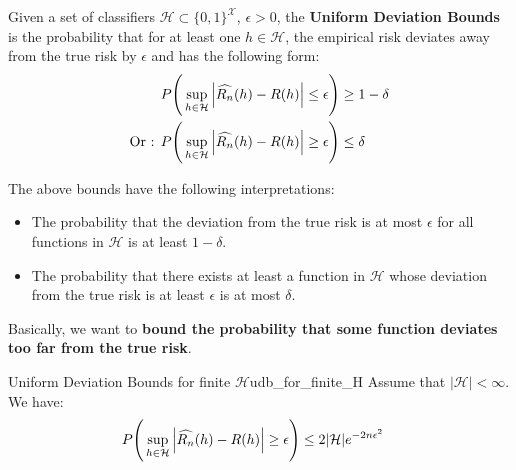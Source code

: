 \begin{definition}
    Given a set of classifiers $\mathcal{H} \subset \{0,1\}^{\mathcal{X}}$, $\epsilon > 0$, the \textbf{Uniform Deviation Bounds} is the probability that for at least one $h\in\mathcal{H}$, the empirical risk deviates away from the true risk by $\epsilon$ and has the following form:
    \begin{align*}
        P\Bigg( 
            \sup_{h\in\mathcal{H}}\Big| \widehat{R_n}(h) - R(h) \Big| \le \epsilon
         \Bigg) &\ge 1 - \delta \\
        \text{Or : }
        P\Bigg( 
            \sup_{h\in\mathcal{H}}\Big| \widehat{R_n}(h) - R(h) \Big| \ge \epsilon
         \Bigg) &\le \delta
    \end{align*}

    \noindent The above bounds have the following interpretations:
    \begin{itemize}
        \item The probability that the deviation from the true risk is at most $\epsilon$ for all functions in $\mathcal{H}$ is at least $1-\delta$.
        \item The probability that there exists at least a function in $\mathcal{H}$ whose deviation from the true risk is at least $\epsilon$ is at most $\delta$.
    \end{itemize}

    \noindent Basically, we want to \textbf{bound the probability that some function deviates too far from the true risk}.
\end{definition}

\begin{theorem}{Uniform Deviation Bounds for finite $\mathcal{H}$}{udb_for_finite_H}
    Assume that $|\mathcal{H}| < \infty$. We have:
    \begin{align*}
        P\Bigg( 
            \sup_{h\in\mathcal{H}}\Big| \widehat{R_n}(h) - R(h) \Big| \ge \epsilon
         \Bigg) &\le 2|\mathcal{H}|e^{-2n\epsilon^2}
    \end{align*}
\end{theorem}

